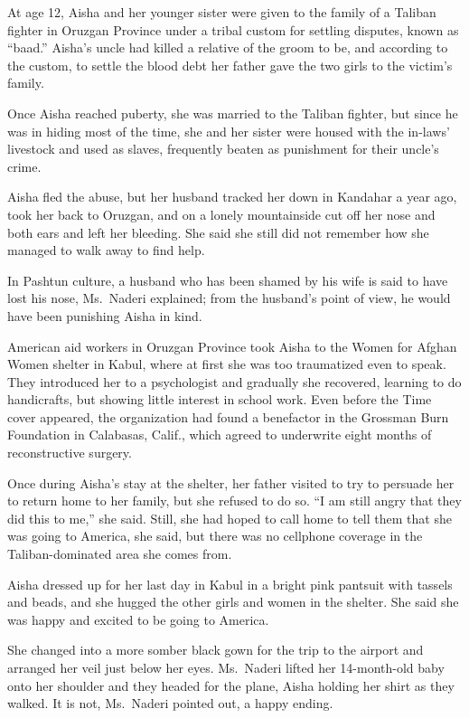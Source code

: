 ﻿\documentclass[12pt]{article}
\begin{document}
At age 12, Aisha and her younger sister were given to the family of a Taliban fighter in Oruzgan
Province under a tribal custom for settling disputes, known as ``baad.'' Aisha's uncle had killed a
relative of the groom to be, and according to the custom, to settle the blood debt her father gave
the two girls to the victim's family.

Once Aisha reached puberty, she was married to the Taliban fighter, but since he was in hiding most
of the time, she and her sister were housed with the in-laws' livestock and used as slaves,
frequently beaten as punishment for their uncle's crime.

Aisha fled the abuse, but her husband tracked her down in Kandahar a year ago, took her back to
Oruzgan, and on a lonely mountainside cut off her nose and both ears and left her bleeding. She said
she still did not remember how she managed to walk away to find help.

In Pashtun culture, a husband who has been shamed by his wife is said to have lost his nose,
Ms.~Naderi explained; from the husband's point of view, he would have been punishing Aisha in kind.

American aid workers in Oruzgan Province took Aisha to the Women for Afghan Women shelter in Kabul,
where at first she was too traumatized even to speak. They introduced her to a psychologist and
gradually she recovered, learning to do handicrafts, but showing little interest in school work.
Even before the Time cover appeared, the organization had found a benefactor in the Grossman Burn
Foundation in Calabasas, Calif., which agreed to underwrite eight months of reconstructive surgery.

Once during Aisha's stay at the shelter, her father visited to try to persuade her to return home to
her family, but she refused to do so. ``I am still angry that they did this to me,'' she said.
Still, she had hoped to call home to tell them that she was going to America, she said, but there
was no cellphone coverage in the Taliban-dominated area she comes from.

Aisha dressed up for her last day in Kabul in a bright pink pantsuit with tassels and beads, and she
hugged the other girls and women in the shelter. She said she was happy and excited to be going to
America.

She changed into a more somber black gown for the trip to the airport and arranged her veil just
below her eyes. Ms.~Naderi lifted her 14-month-old baby onto her shoulder and they headed for the
plane, Aisha holding her shirt as they walked. It is not, Ms.~Naderi pointed out, a happy ending.
\end{document}
